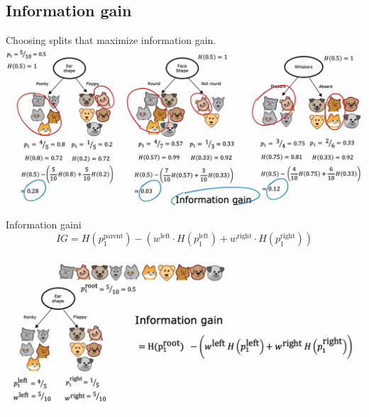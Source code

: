 \subsection*{Information gain}
Choosing splits that maximize information gain.\\
\includegraphics*[width=\textwidth]{images/11.6}
\begin{thmbox}{Information gain}{i}
\begin{equation}
    IG = H(p_1^{\text{parent}}) - \left(w^{\text{left}}\cdot H\left(p_1^{\text{left}}\right) 
    + w^{\text{right}}\cdot H\left(p_1^{\text{right}}\right)\right)
\end{equation}
\end{thmbox}
\includegraphics*[width=\textwidth]{images/11.7}
